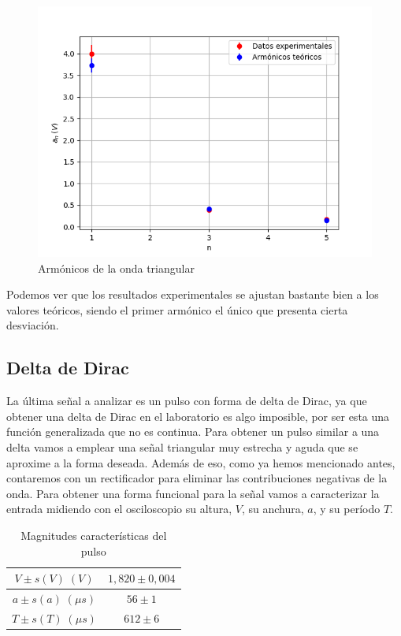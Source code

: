 \documentclass[a4paper,12pt,titlepage]{article}
\begin{document}
\begin{figure}[h!]
    \centering
    \includegraphics[width=0.6\linewidth]{fourier/arm_triangular.png}
    \caption{Armónicos de la onda triangular}
    \label{fig:enter-label}
\end{figure}

Podemos ver que los resultados experimentales se ajustan bastante bien a los valores teóricos, siendo el primer armónico el único que presenta cierta desviación.

\subsection{Delta de Dirac}

La última señal a analizar es un pulso con forma de delta de Dirac, ya que obtener una delta de Dirac en el laboratorio es algo imposible, por ser esta una función generalizada que no es continua. Para obtener un pulso similar a una delta vamos a emplear una señal triangular muy estrecha y aguda que se aproxime a la forma deseada. Además de eso, como ya hemos mencionado antes, contaremos con un rectificador para eliminar las contribuciones negativas de la onda. Para obtener una forma funcional para la señal vamos a caracterizar la entrada midiendo con el osciloscopio su altura, $V$, su anchura, $a$, y su período $T$. 

\begin{table}[h!]
\centering
\begin{tabular}{|c|c|}
\hline
$V\pm s(V)\; (V)$ & $1,820 \pm 0,004$\\ \hline
$a \pm s(a)\; (\mu s)$ &  $56 \pm 1$\\ \hline
$T \pm s(T)\; (\mu s)$ &  $612 \pm 6$\\ \hline
\end{tabular}
\caption{Magnitudes características del pulso}
\label{tab:my-table}
\end{table}
\end{document}
